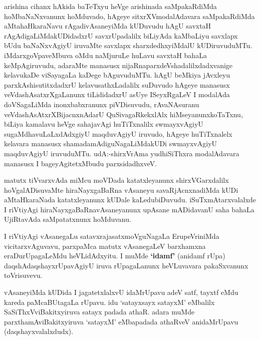 \centerline{}

\begin{artha}
arishina cihanx hAkida baTeTxyu heVge arishinada saMpakaRdiMda
hoMbaNaNxvanunx hoMduvado, hAgeye sitxrXVmodalAdavara saMpakaRdiMda
aMtahaHkaraNavu rAgadivAsaneyiMda kUDuvudu hAgU savxtaH
rAgAdigaLiMdakUDidadxrU savxrUpadalilx biLiyAda kaMbaLiyu savxlapx
bUdu baNaNxvAgiyU iruvaMte savxlapx sharxdedhxyiMdalU
kUDiruvuduMTu. iMdarxgoVpaveMbuva oMdu naMjuruLe huLavu savxtaH bahaLa
keMpAgiruvudu, adaraMte manasusx nijaRnaparxdeVshadalilxdadxvanige
kelavukaDe viSayagaLa kaDege bAguvuduMTu. hAgU beMkiya jAvxleyu
parxkAshisutitxdadxrU kelavusathxLadalilx suDuvudo hAgeye manasusx
veVdashAsatxrXgaLanunx tiLididadxrU asUye ISeyxRgaLeV I modalAda
doVSagaLiMda inonxbabxranunx piVDisuvudu, rAvaNAsuranu
veVdashAsAtxrXBijacnxnAdarU QuSivagaRkekxlAlx hiMseyanunxkoTaTxnu,
biLiya kamalavu heVge sahajavAgi huTiTxnalilx swmayxvAgiyU
sugaMdhavuLaLxdAdxgiyU maqduvAgiyU iruvudo, hAgeye huTiTxnalelx
kelavara manasusx shamadamAdiguNagaLiMdakUDi swmayxvAgiyU maqduvAgiyU\break
iruvuduMTu. udA:-shirxVrAma yudhiSiThxra modalAdavara manasusx I
bageyAgitetxMbudu parxsidadhxveV.
\end{artha}

\begin{artha}
matutx tiVvarxvAda miMcu moVDada katatxleyanunx shirxVGarxdalilx
hoVgalADisuvaMte hiraNayxgaBaRna vAsaneyu savaRjAcnxnadiMda kUDi
aMtaHkaraNada katatxleyanunx kUDale kaLedubiDuvudu. iSuTxmAtarxvalalxde
I riVtiyAgi hiraNayxgaBaRna\break vAsaneyanunx upAsane mADidavanU saha
bahaLa UjiRtavAda saMpatatxnunx hoMduvanu.
\end{artha}

\begin{artha}
I riVtiyAgi vAsanegaLu satavxrajasatxmoVguNagaLa ErupeVriniMda
vicitarxvAguvavu, parxpaMca matutx vAsanegaLeV barxhamxna
eraDurUpagaLeMdu heVLidAdxyitu. I muMde \textbf{`idamf'} (anidamf rUpa)
daqshAdaqshayxrUpavAgiyU iruva rUpagaLanunx heVLuvavara pakaSxvanunx toVrisuvevu.
\end{artha}

\centerline{}

\begin{artha}
 vAsaneyiMda kUDida I jagatetxlalxvU idaMrUpavu adeV satf, tayxtf eMdu kareda paMcaBUtagaLa rUpavu. idu `satayxsayx satayxM' eMbalilx SaSiThxVviBakitxyiruva satayx padada athaR. adara muMde parxthamAviBakitxyiruva `satayxM' eMbapadada athaRveV anidaMrUpavu (daqshayxvalalxdudx).
\end{artha}

